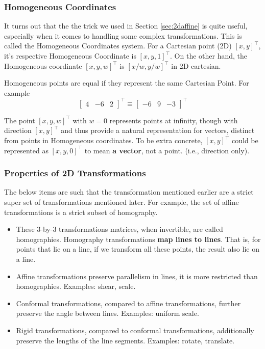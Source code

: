 \documentclass[11pt]{article}
\begin{document}
\subsubsection{Homogeneous Coordinates}
It turns out that the the trick we used in Section \ref{sec:2daffine} is quite useful, especially when it comes to handling some complex transformations. This is called the Homogeneous Coordinates system. For a Cartesian point (2D) $[x, y]^\top$, it's respective Homogeneous Coordinate is $[x, y, 1]^\top$. On the other hand, the Homogeneous coordinate $[x, y, w]^\top$ is $[x/w, y/w]^\top$ in 2D cartesian. 

Homogeneous points are equal if they represent the same Cartesian Point. For example 
\begin{equation}
	\begin{bmatrix}
		4 & -6 & 2
	\end{bmatrix}^\top \equiv \begin{bmatrix}
		-6 & 9 & -3
	\end{bmatrix}^\top
\end{equation}

The point $[x, y, w]^\top$ with $w = 0$ represents points at infinity, though with direction $[x, y]^\top$ and thus provide a natural representation for vectors, distinct from points in Homogeneous coordinates. To be extra concrete, $[x, y]^\top$ could be represented as $[x, y, 0]^\top$ to mean \textbf{a vector}, not a point. (i.e., direction only). 

\subsubsection{Properties of 2D Transformations}
The below items are such that the transformation mentioned earlier are a strict super set of transformations mentioned later. For example, the set of affine transformations is a strict subset of homography. 
\begin{itemize}
	\item These 3-by-3 transformations matrices, when invertible, are called homographies. Homography transformations \textbf{map lines to lines}. That is, for points that lie on a line, if we transform all these points, the result also lie on a line. 
	\item Affine transformations preserve parallelism in lines, it is more restricted than homographies. Examples: shear, scale.
	\item Conformal transformations, compared to affine transformations, further preserve the angle between lines. Examples: uniform scale.
	\item Rigid transformations, compared to conformal transformations, additionally preserve the lengths of the line segments. Examples: rotate, translate.
\end{itemize}
\end{document}
